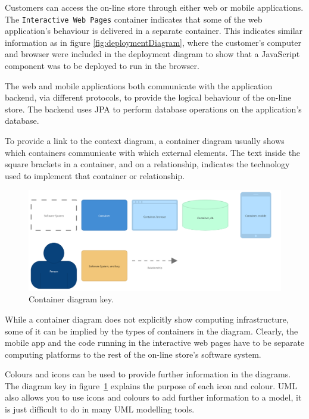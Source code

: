 \noindent
Customers can access the on-line store through either web or mobile applications.
The \texttt{Interactive Web Pages} container indicates that some of the web application's behaviour is delivered in a separate container.
This indicates similar information as in figure \ref{fig:deploymentDiagram},
where the customer's computer and browser were included in the deployment diagram to show that a JavaScript component was to be deployed to run in the browser.

The web and mobile applications both communicate with the application backend, via different protocols, to provide the logical behaviour of the on-line store.
The backend uses JPA to perform database operations on the application's database.

To provide a link to the context diagram, a container diagram usually shows which containers communicate with which external elements.
The text inside the square brackets in a container, and on a relationship, indicates the technology used to implement that container or relationship.

\begin{figure}[h!]
    \centering
    \includegraphics[trim=24 21 98 26,clip,width=\textwidth]{images/c4/container_diagram-key.png}
    \caption{Container diagram key.}
    \label{fig:c4_container_key}
\end{figure}

While a container diagram does not explicitly show computing infrastructure,
some of it can be implied by the types of containers in the diagram.
Clearly, the mobile app and the code running in the interactive web pages
have to be separate computing platforms to the rest of the on-line store's software system.

Colours and icons can be used to provide further information in the diagrams.
The diagram key in figure~\ref{fig:c4_container_key} explains the purpose of each icon and colour.
UML also allows you to use icons and colours to add further information to a model, it is just difficult to do in many UML modelling tools.

